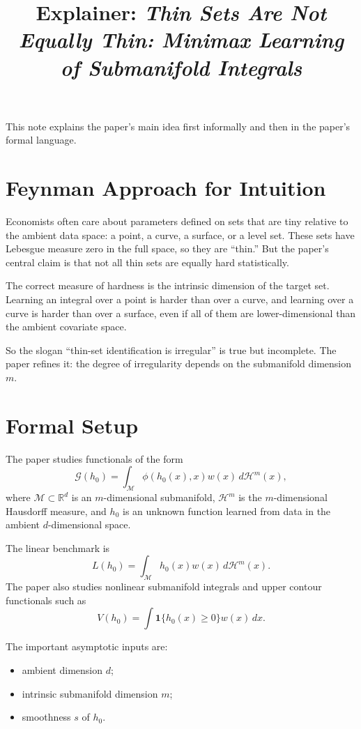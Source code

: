 \documentclass[11pt]{article}
\begin{document}
\title{Explainer: \emph{Thin Sets Are Not Equally Thin: Minimax Learning of Submanifold Integrals}}
\author{}
\date{}
\maketitle

This note explains the paper's main idea first informally and then in the paper's formal language.

\section{Feynman Approach for Intuition}

Economists often care about parameters defined on sets that are tiny relative to the ambient data space: a point, a curve, a surface, or a level set. These sets have Lebesgue measure zero in the full space, so they are ``thin.'' But the paper's central claim is that not all thin sets are equally hard statistically.

The correct measure of hardness is the intrinsic dimension of the target set. Learning an integral over a point is harder than over a curve, and learning over a curve is harder than over a surface, even if all of them are lower-dimensional than the ambient covariate space.

So the slogan ``thin-set identification is irregular'' is true but incomplete. The paper refines it: the degree of irregularity depends on the submanifold dimension $m$.

\section{Formal Setup}

The paper studies functionals of the form
\[
\mathcal G(h_0)=\int_{\mathcal M}\phi(h_0(x),x)w(x)\,d\mathcal H^m(x),
\]
where $\mathcal M\subset\mathbb R^d$ is an $m$-dimensional submanifold, $\mathcal H^m$ is the $m$-dimensional Hausdorff measure, and $h_0$ is an unknown function learned from data in the ambient $d$-dimensional space.

The linear benchmark is
\[
L(h_0)=\int_{\mathcal M} h_0(x)w(x)\,d\mathcal H^m(x).
\]
The paper also studies nonlinear submanifold integrals and upper contour functionals such as
\[
V(h_0)=\int \mathbf 1\{h_0(x)\ge 0\}w(x)\,dx.
\]

The important asymptotic inputs are:
\begin{itemize}
\item ambient dimension $d$;
\item intrinsic submanifold dimension $m$;
\item smoothness $s$ of $h_0$.
\end{itemize}
\end{document}
